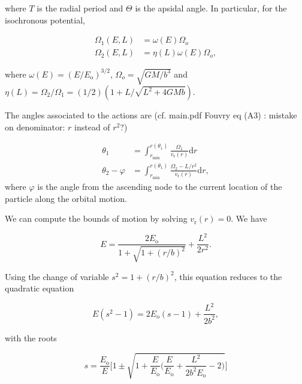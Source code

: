 \documentclass[11pt]{article}
\newcommand{\rr}{\mathrm{r}}
\newcommand{\ro}{\mathrm{o}}
\newcommand{\rd}{{\mathrm{d}}}
\newcommand{\vr}{v_{\rr}}
\newcommand{\Eo}{E_{\ro}}
\newcommand{\rmin}{r_{\min}}
\begin{document}
where $T$ is the radial period and $\Theta$ is the apsidal angle. In particular, for the isochronous potential,

\begin{align*}
  \Omega_{1} (E,L)&= \omega(E) \Omega_{o} \\
  \Omega_{2} (E,L)&= \eta(L) \omega(E) \Omega_{o} ,
\end{align*}

where $\omega(E) = (E/\Eo)^{3/2}$, $\Omega_{o}=\sqrt{GM/b^{3}}$ and $\eta(L)=\Omega_{2}/\Omega_{1}=(1/2)(1+L/\sqrt{L^{2}+4GMb})$.

The angles associated to the actions are (cf. main.pdf Fouvry eq (A3) : mistake on denominator: $r$ instead of $r^{2}$?)

\begin{align*}
  \theta_{1} &= \int_{\rmin}^{r(\theta_{1})} \frac{\Omega_{1}}{\vr(r)} \rd r \\
  \theta_{2} - \varphi &= \int_{\rmin}^{r(\theta_{1})} \frac{\Omega_{2} - L/r^{2}}{\vr(r)} \rd r,
  \end{align*}
where $\varphi$ is the angle from the ascending node to the current location
of the particle along the orbital motion.

We can compute the bounds of motion by solving $\vr(r)=0$. We have

$$E=\frac{2\Eo}{1+\sqrt{1+(r/b)^{2}}} + \frac{L^{2}}{2r^{2}} .$$
  
Using the change of variable $s^{2}=1+(r/b)^{2}$, this equation reduces to the quadratic equation

$$E(s^{2}-1) = 2\Eo(s-1) + \frac{L^{2}}{2b^{2}} ,$$

with the roots

$$s = \frac{\Eo}{E} \bigg[1 \pm \sqrt{1+\frac{E}{\Eo}\bigg(\frac{E}{\Eo}+\frac{L^{2}}{2b^{2}\Eo 
}-2\bigg)} \bigg]$$
\end{document}

